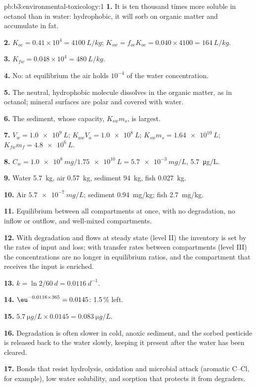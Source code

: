 \begin{solution}{pb:b3:environmental-toxicology:1}
\textbf{1.} It is ten thousand times more soluble in octanol than in water: hydrophobic,
it will sorb on organic matter and accumulate in fat.

\textbf{2.} $K_{oc} = 0.41 \times 10^4 = \qty{4100}{L/kg}$; $K_{sw} = f_{oc}K_{oc} = 0.040 \times 4100 = \qty{164}{L/kg}$.

\textbf{3.} $K_{fw} = 0.048 \times 10^4 = \qty{480}{L/kg}$.

\textbf{4.} No: at equilibrium the air holds $10^{-4}$ of the water concentration.

\textbf{5.} The neutral, hydrophobic molecule dissolves in the organic matter, as in
octanol; mineral surfaces are polar and covered with water.

\textbf{6.} The sediment, whose capacity, $K_{sw}m_s$, is largest.

\textbf{7.} $V_w = \qty{1.0e9}{L}$; $K_{aw}V_a = \qty{1.0e8}{L}$; $K_{sw}m_s = \qty{1.64e10}{L}$; $K_{fw}m_f = \qty{4.8e6}{L}$.

\textbf{8.} $C_w = \qty{1.0e8}{mg}/\qty{1.75e10}{L} = \qty{5.7e-3}{mg/L}$, \qty{5.7}{\micro g/L}.

\textbf{9.} Water \qty{5.7}{kg}, air \qty{0.57}{kg}, sediment \qty{94}{kg}, fish \qty{0.027}{kg}.

\textbf{10.} Air $\qty{5.7e-7}{mg/L}$; sediment \qty{0.94}{mg/kg}; fish \qty{2.7}{mg/kg}.

\textbf{11.} Equilibrium between all compartments at once, with no degradation, no
inflow or outflow, and well-mixed compartments.

\textbf{12.} With degradation and flows at steady state (level II) the inventory is set by
the rates of input and loss; with transfer rates between compartments (level III)
the concentrations are no longer in equilibrium ratios, and the compartment that
receives the input is enriched.

\textbf{13.} $k = \ln 2/\qty{60}{d} = \qty{0.0116}{d^{-1}}$.

\textbf{14.} $\eu^{-0.0116 \times 365} = 0.0145$: 1.5\,\% left.

\textbf{15.} $\qty{5.7}{\micro g/L} \times 0.0145 = \qty{0.083}{\micro g/L}$.

\textbf{16.} Degradation is often slower in cold, anoxic sediment, and the sorbed
pesticide is released back to the water slowly, keeping it present after the
water has been cleared.

\textbf{17.} Bonds that resist hydrolysis, oxidation and microbial attack (aromatic
C--Cl, for example), low water solubility, and sorption that protects it from
degraders.


\end{solution}
